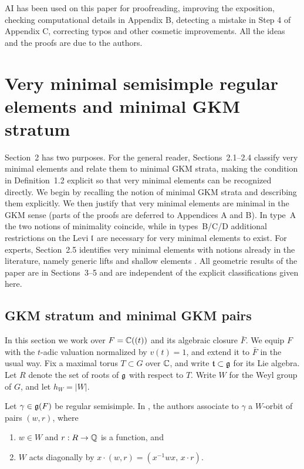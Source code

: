 \documentclass[11pt]{article}
\numberwithin{equation}{section}
\begin{document}
AI has been used on this paper for proofreading, improving the exposition,
checking computational details in Appendix B, detecting a mistake in Step 4 of
Appendix C, correcting typos and other cosmetic improvements. All the ideas and the proofs are due to the authors.

\section{Very minimal semisimple regular elements and minimal GKM stratum}
Section~2 has two purposes. For the general reader, Sections~2.1--2.4 classify very minimal
elements and relate them to minimal GKM strata, making the condition in Definition~1.2
explicit so that very minimal elements can be recognized directly. We begin by recalling the
notion of minimal GKM strata and describing them explicitly. We then justify that very
minimal elements are minimal in the GKM sense (parts of the proofs are deferred to Appendices A and B). In type~A the two notions of minimality coincide, while in
types~B/C/D additional restrictions on the Levi $\mathfrak{l}$ are necessary for very minimal elements
to exist. For experts, Section~2.5 identifies very minimal elements with notions already in
the literature, namely generic lifts \cite{KL88} and shallow elements \cite{Yun2021}. All
geometric results of the paper are in Sections~3--5 and are independent of the explicit
classifications given here.

\subsection{GKM stratum and minimal GKM pairs}
In this section we work over $F=\mathbb{C}((t))$ and its algebraic closure $\bar F$.
We equip $F$ with the $t$-adic valuation normalized by $v(t)=1$, and extend it to
$\bar F$ in the usual way. Fix a maximal torus $T\subset G$ over $\mathbb{C}$, and write
$\mathfrak{t}\subset\mathfrak{g}$ for its Lie algebra. Let $R$ denote the set of roots of $\mathfrak{g}$ with
respect to $T$. Write $W$ for the Weyl group of $G$, and let $h_W=|W|$.

Let $\gamma\in\mathfrak{g}(F)$ be regular semisimple. In \cite[Section~1]{GKMstrat}, the authors
associate to $\gamma$ a $W$-orbit of pairs $(w,r)$, where
\begin{enumerate}
\item $w\in W$ and $r:R\to\mathbb{Q}$ is a function, and
\item $W$ acts diagonally by $x\cdot(w,r)=(x^{-1}wx,\,x\cdot r)$.
\end{enumerate}
\end{document}
